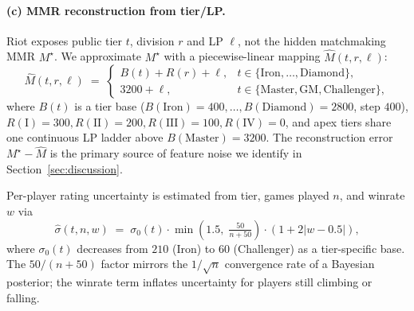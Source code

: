 \documentclass{article}
\begin{document}
\paragraph{(c) MMR reconstruction from tier/LP.}
Riot exposes public tier $t$, division $r$ and LP $\ell$, not the hidden
matchmaking MMR $M^\star$. We approximate $M^\star$ with a piecewise-linear
mapping $\widehat{M}(t, r, \ell)$:
\begin{equation}
\widehat{M}(t, r, \ell) \;=\;
\begin{cases}
B(t) + R(r) + \ell, & t \in \{\text{Iron}, \ldots, \text{Diamond}\},\\
3200 + \ell, & t \in \{\text{Master}, \text{GM}, \text{Challenger}\},
\end{cases}
\label{eq:mmr}
\end{equation}
where $B(t)$ is a tier base ($B(\text{Iron})=400, \ldots, B(\text{Diamond})=2800$,
step $400$), $R(\text{I})=300, R(\text{II})=200, R(\text{III})=100, R(\text{IV})=0$,
and apex tiers share one continuous LP ladder above $B(\text{Master})=3200$.
The reconstruction error $M^\star - \widehat{M}$ is the primary source of
feature noise we identify in Section~\ref{sec:discussion}.

Per-player rating uncertainty is estimated from tier, games played $n$,
and winrate $w$ via
\begin{equation}
\widehat{\sigma}(t, n, w) \;=\;
\sigma_0(t) \cdot \min\!\left(1.5,\; \tfrac{50}{n+50}\right)
\cdot \left(1 + 2|w - 0.5|\right),
\label{eq:sigma}
\end{equation}
where $\sigma_0(t)$ decreases from $210$ (Iron) to $60$ (Challenger) as a
tier-specific base. The $50/(n+50)$ factor mirrors the $1/\sqrt{n}$
convergence rate of a Bayesian posterior; the winrate term inflates
uncertainty for players still climbing or falling.
\end{document}
